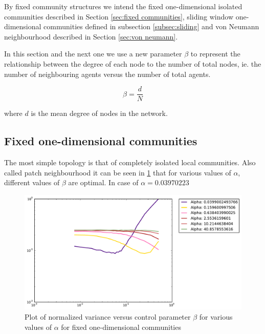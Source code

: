By fixed community structures we intend the fixed one-dimensional isolated communities described in Section \ref{sec:fixed communities}, sliding window one-dimensional communities defined in subsection \ref{subsec:sliding} and von Neumann neighbourhood described in Section \ref{sec:von neumann}.

In this section and the next one we use a new parameter $\beta$ to represent the relationship between the degree of each node to the number of total nodes, ie. the number of neighbouring agents versus the number of total agents.

\begin{displaymath}
\beta = \frac{d}{N}
\end{displaymath}

where $d$ is the mean degree of nodes in the network.

\subsection{Fixed one-dimensional communities}

The most simple topology is that of completely isolated local communities.
Also called patch neighbourhood it can be seen in \ref{fig:patch vicinity partial} that for various values of $\alpha$, different values of $\beta$ are optimal.
In case of $\alpha=0.03970223$ 

\begin{figure}[h]
\begin{center}
\includegraphics[scale=0.4]{images/results/vicinity_patch_n401_rounds10000_partial.pdf}
\caption{Plot of normalized variance versus control parameter $\beta$ for various values of $\alpha$  for fixed one-dimensional communities}
\label{fig:patch vicinity partial}
\end{center}
\end{figure}

